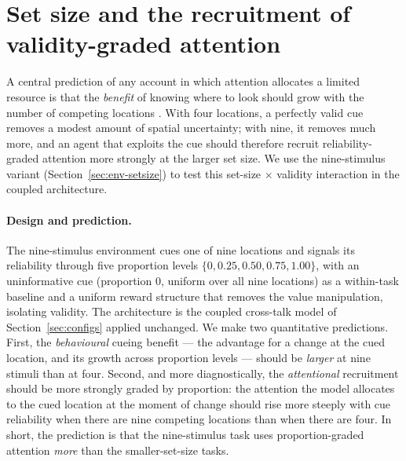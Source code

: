 \section{Set size and the recruitment of validity-graded attention}
\label{sec:setsize}

A central prediction of any account in which attention allocates a limited resource is
that the \emph{benefit} of knowing where to look should grow with the number of competing
locations \citep{palmer1995psychophysics, mazyar2012does, eckstein2013visual}. With four
locations, a perfectly valid cue removes a modest amount of spatial uncertainty; with nine,
it removes much more, and an agent that exploits the cue should therefore recruit
reliability-graded attention more strongly at the larger set size. We use the nine-stimulus
variant (Section~\ref{sec:env-setsize}) to test this set-size $\times$ validity interaction
in the coupled architecture.

\paragraph{Design and prediction.}
The nine-stimulus environment cues one of nine locations and signals its reliability through
five proportion levels $\{0, 0.25, 0.50, 0.75, 1.00\}$, with an uninformative cue
(proportion $0$, uniform over all nine locations) as a within-task baseline and a uniform
reward structure that removes the value manipulation, isolating validity. The architecture is
the coupled cross-talk model of Section~\ref{sec:configs} applied unchanged. We make two
quantitative predictions. First, the \emph{behavioural} cueing benefit --- the advantage for a
change at the cued location, and its growth across proportion levels --- should be
\emph{larger} at nine stimuli than at four. Second, and more diagnostically, the
\emph{attentional} recruitment should be more strongly graded by proportion: the attention the
model allocates to the cued location at the moment of change should rise more steeply with cue
reliability when there are nine competing locations than when there are four. In short, the
prediction is that the nine-stimulus task uses proportion-graded attention \emph{more} than the
smaller-set-size tasks.

